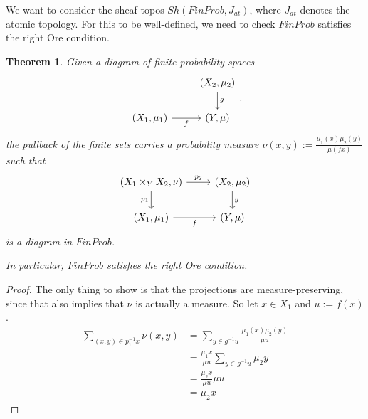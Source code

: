 \documentclass[a4paper]{amsproc}
\theoremstyle{plain}
\newtheorem{theorem}{Theorem}[section]
\theoremstyle{definition}
\theoremstyle{remark}
\numberwithin{equation}{section}
\begin{document}
We want to consider the sheaf topos $Sh(FinProb, J_{at})$, where $J_{at}$ denotes the atomic topology. For this to be well-defined, we need to check $FinProb$ satisfies the right Ore condition.

\begin{theorem} \label{pullback_measure}
Given a diagram of finite probability spaces
\[
\begin{tikzcd}
                               & {(X_2,\mu_2)} \arrow[d, "g"] \\
{(X_1, \mu_1)} \arrow[r, "f"'] & {(Y,\mu)}                   
\end{tikzcd},
\]
the pullback of the finite sets carries a probability measure $\nu(x,y) := \frac{\mu_1(x) \mu_2(y)}{\mu(f x)}$ such that
\[
\begin{tikzcd}
{(X_1 \times_Y X_2, \nu)} \arrow[d, "p_1"'] \arrow[r, "p_2"] & {(X_2,\mu_2)} \arrow[d, "g"] \\
{(X_1, \mu_1)} \arrow[r, "f"']                               & {(Y,\mu)}                   
\end{tikzcd}
\]
is a diagram in $FinProb$.

In particular, $FinProb$ satisfies the right Ore condition.
\end{theorem}
\begin{proof}
The only thing to show is that the projections are measure-preserving, since that also implies that $\nu$ is actually a measure. So let $x \in X_1$ and $u := f(x)$.
\begin{align*}
\sum_{(x,y) \in p_1^{-1} x} \nu(x,y) &= \sum_{y \in g^{-1} u} \frac{\mu_1(x)\mu_2(y)}{\mu u} \\
&= \frac{\mu_1 x}{\mu u} \sum_{y \in g^{-1} u} \mu_2 y \\
&= \frac{\mu_2 x}{\mu u} \mu u \\
&= \mu_2 x
\end{align*}
\end{proof}
\end{document}
